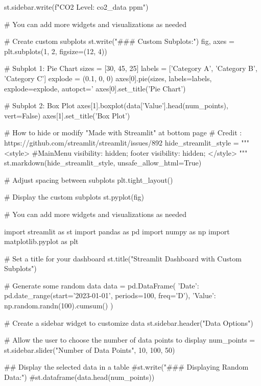 st.sidebar.write(f"CO2 Level: {co2_data} ppm")

# You can add more widgets and visualizations as needed














# Create custom subplots
st.write("### Custom Subplots:")
fig, axes = plt.subplots(1, 2, figsize=(12, 4))

# Subplot 1: Pie Chart
sizes = [30, 45, 25]
labels = ['Category A', 'Category B', 'Category C']
explode = (0.1, 0, 0)
axes[0].pie(sizes, labels=labels, explode=explode, autopct='%
axes[0].set_title('Pie Chart')

# Subplot 2: Box Plot
axes[1].boxplot(data['Value'].head(num_points), vert=False)
axes[1].set_title('Box Plot')



# How to hide or modify "Made with Streamlit" at bottom page
# Credit : https://github.com/streamlit/streamlit/issues/892
hide_streamlit_style = """
            <style>
            #MainMenu {visibility: hidden;}
            footer {visibility: hidden;}
            </style>
            """
st.markdown(hide_streamlit_style, unsafe_allow_html=True) 


# Adjust spacing between subplots
plt.tight_layout()

# Display the custom subplots
st.pyplot(fig)

# You can add more widgets and visualizations as needed




import streamlit as st
import pandas as pd
import numpy as np
import matplotlib.pyplot as plt

# Set a title for your dashboard
st.title("Streamlit Dashboard with Custom Subplots")

# Generate some random data
data = pd.DataFrame({
    'Date': pd.date_range(start='2023-01-01', periods=100, freq='D'),
    'Value': np.random.randn(100).cumsum()
})

# Create a sidebar widget to customize data
st.sidebar.header("Data Options")

# Allow the user to choose the number of data points to display
num_points = st.sidebar.slider("Number of Data Points", 10, 100, 50)

 ## Display the selected data in a table
#st.write("### Displaying Random Data:")
#st.dataframe(data.head(num_points))



